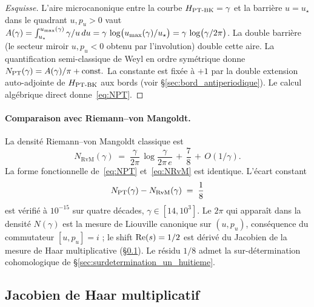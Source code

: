 \begin{proof}[Esquisse]
L'aire microcanonique entre la courbe $H_{\mathrm{PT\text{-}BK}} = \gamma$ et la barrière
$u = u_\star$ dans le quadrant $u, p_u > 0$ vaut
$A(\gamma) = \int_{u_\star}^{u_{\max}(\gamma)} \gamma/u\,du
= \gamma\,\log\!\big(u_{\max}(\gamma)/u_\star\big)
= \gamma\,\log\!\big(\gamma/2\pi\big)$.
La double barrière (le secteur miroir $u, p_u < 0$ obtenu par l'involution)
double cette aire. La quantification semi-classique de Weyl en ordre
symétrique donne $N_{\mathrm{PT}}(\gamma) = A(\gamma)/\pi + \text{const.}$ La
constante est fixée à $+1$ par la double extension auto-adjointe de
$H_{\mathrm{PT\text{-}BK}}$ aux bords (voir \S\ref{sec:bord_antiperiodique}). Le calcul
algébrique direct donne~\eqref{eq:NPT}.
\end{proof}

\paragraph{Comparaison avec Riemann--von Mangoldt.}
La densité Riemann--von Mangoldt classique \cite{Edwards1974} est
\begin{equation}
N_{\mathrm{RvM}}(\gamma) \;=\; \dfrac{\gamma}{2\pi}\,\log\dfrac{\gamma}{2\pi\,e} \,+\, \dfrac{7}{8} \,+\, O(1/\gamma).
\label{eq:NRvM}
\end{equation}
La forme fonctionnelle de~\eqref{eq:NPT} et~\eqref{eq:NRvM} est
identique. L'écart constant
\begin{equation}
N_{\mathrm{PT}}(\gamma) - N_{\mathrm{RvM}}(\gamma) \;=\; \dfrac{1}{8}
\label{eq:residu_un_huitieme}
\end{equation}
est vérifié à $10^{-15}$ sur quatre décades, $\gamma \in [14, 10^{3}]$.
Le $2\pi$ qui apparaît dans la densité $N(\gamma)$ est la mesure de
Liouville canonique sur $(u, p_u)$, conséquence du commutateur
$[u, p_u] = i$ ; le shift $\operatorname{Re}(s) = 1/2$ est dérivé du Jacobien de la
mesure de Haar multiplicative (\S\ref{sec:haar_jacobien}). Le résidu
$1/8$ admet la sur-détermination cohomologique de
\S\ref{sec:surdetermination_un_huitieme}.

\subsection{Jacobien de Haar multiplicatif}
\label{sec:haar_jacobien}

